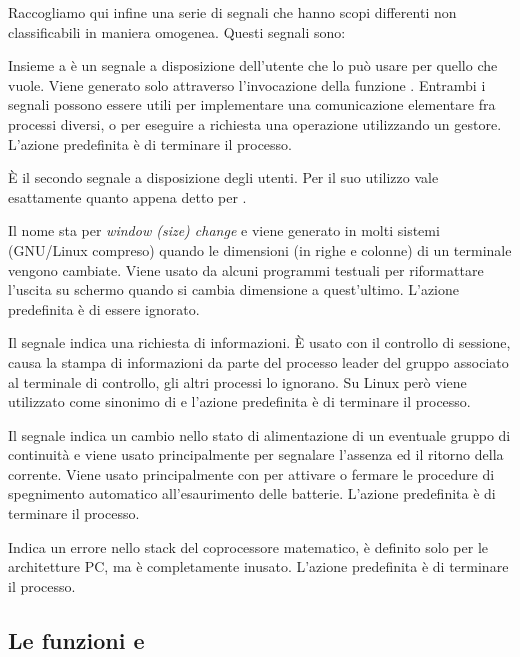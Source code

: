 Raccogliamo qui infine una serie di segnali che hanno scopi differenti non
classificabili in maniera omogenea. Questi segnali sono:
\begin{basedescript}{\desclabelwidth{2.0cm}}
\item[\signald{SIGUSR1}] Insieme a  è un segnale a disposizione
  dell'utente che lo può usare per quello che vuole. Viene generato solo
  attraverso l'invocazione della funzione . Entrambi i segnali
  possono essere utili per implementare una comunicazione elementare fra
  processi diversi, o per eseguire a richiesta una operazione utilizzando un
  gestore. L'azione predefinita è di terminare il processo.
\item[\signald{SIGUSR2}] È il secondo segnale a disposizione degli utenti. Per
  il suo utilizzo vale esattamente quanto appena detto per .
\item[\signald{SIGWINCH}] Il nome sta per \textit{window (size) change} e viene
  generato in molti sistemi (GNU/Linux compreso) quando le dimensioni (in
  righe e colonne) di un terminale vengono cambiate. Viene usato da alcuni
  programmi testuali per riformattare l'uscita su schermo quando si cambia
  dimensione a quest'ultimo. L'azione predefinita è di essere ignorato.
\item[\signald{SIGINFO}] Il segnale indica una richiesta di informazioni. È
  usato con il controllo di sessione, causa la stampa di informazioni da parte
  del processo leader del gruppo associato al terminale di controllo, gli
  altri processi lo ignorano. Su Linux però viene utilizzato come sinonimo di
   e l'azione predefinita è di terminare il processo.
\item[\signald{SIGPWR}] Il segnale indica un cambio nello stato di
  alimentazione di un eventuale gruppo di continuità e viene usato
  principalmente per segnalare l'assenza ed il ritorno della corrente. Viene
  usato principalmente con  per attivare o fermare le procedure di
  spegnimento automatico all'esaurimento delle batterie. L'azione predefinita
  è di terminare il processo.
\item[\signald{SIGSTKFLT}] Indica un errore nello stack del coprocessore
  matematico, è definito solo per le architetture PC, ma è completamente
  inusato. L'azione predefinita è di terminare il processo.
\end{basedescript}


\subsection{Le funzioni  e }
\label{sec:sig_strsignal}

